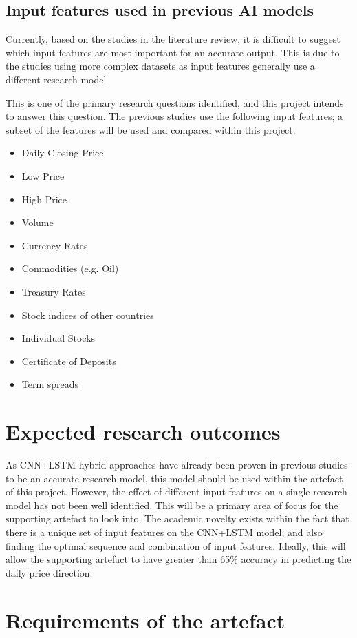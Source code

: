 \subsection{Input features used in previous AI models}
Currently, based on the studies in the literature review, it is difficult to suggest which input features
are most important for an accurate output. This is due to the studies using more complex datasets as input
features generally use a different research model 

This is one of the primary research questions identified, and this project intends to answer this question.
The previous studies use the following input features; a subset of the features will be used and compared
within this project. 
\begin{itemize}
    \item Daily Closing Price
    \item Low Price
    \item High Price
    \item Volume
    \item Currency Rates
    \item Commodities (e.g. Oil)
    \item Treasury Rates
    \item Stock indices of other countries
    \item Individual Stocks
    \item Certificate of Deposits
    \item Term spreads
\end{itemize}

\section{Expected research outcomes}
As CNN+LSTM hybrid approaches have already been proven in previous studies to be an accurate research model,
this model should be used within the artefact of this project. However, the effect of different input
features on a single research model has not been well identified. This will be a primary area of focus for
the supporting artefact to look into. The academic novelty exists within the fact that
there is a unique set of input features on the CNN+LSTM model; and also finding the optimal sequence and
combination of input features. Ideally, this will allow the supporting artefact to have greater than
65\% accuracy in predicting the daily price direction.

\section{Requirements of the artefact}
